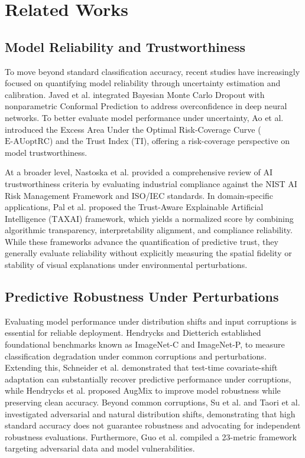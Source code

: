 \documentclass[a4paper,fleqn]{cas-dc}
\begin{document}
	
	
	
	\section{Related Works}
    \label{related_works}
    
	\subsection{Model Reliability and Trustworthiness}
	To move beyond standard classification accuracy, recent studies have increasingly focused on quantifying model reliability through uncertainty estimation and calibration. 
    Javed et al. \cite{ref14} integrated Bayesian Monte Carlo Dropout with nonparametric Conformal Prediction to address overconfidence in deep neural networks. 
    To better evaluate model performance under uncertainty, Ao et al. \cite{ref15} introduced the Excess Area Under the Optimal Risk-Coverage Curve ($\mathrm{E\text{-}AUoptRC}$) and the Trust Index ($\mathrm{TI}$), offering a risk-coverage perspective on model trustworthiness. 

	At a broader level, Nastoska et al. \cite{r53} provided a comprehensive review of AI trustworthiness criteria by evaluating industrial compliance against the NIST AI Risk Management Framework and ISO/IEC standards. 
	In domain-specific applications, Pal et al. \cite{r54} proposed the Trust-Aware Explainable Artificial Intelligence ($\mathrm{TAXAI}$) framework, which yields a normalized score by combining algorithmic transparency, interpretability alignment, and compliance reliability. 
	While these frameworks advance the quantification of predictive trust, they generally evaluate reliability without explicitly measuring the spatial fidelity or stability of visual explanations under environmental perturbations.

	\subsection{Predictive Robustness Under Perturbations}
	Evaluating model performance under distribution shifts and input corruptions is essential for reliable deployment. 
	Hendrycks and Dietterich \cite{ref16} established foundational benchmarks known as ImageNet-C and ImageNet-P, to measure classification degradation under common corruptions and perturbations. 
	Extending this, Schneider et al. \cite{r55} demonstrated that test-time covariate-shift adaptation can substantially recover predictive performance under corruptions, while Hendrycks et al. \cite{ref17} proposed AugMix to improve model robustness while preserving clean accuracy. 
	Beyond common corruptions, Su et al. \cite{ref19} and Taori et al. \cite{ref18} investigated adversarial and natural distribution shifts, demonstrating that high standard accuracy does not guarantee robustness and advocating for independent robustness evaluations. 
	Furthermore, Guo et al. \cite{ref20} compiled a 23-metric framework targeting adversarial data and model vulnerabilities.
\end{document}
